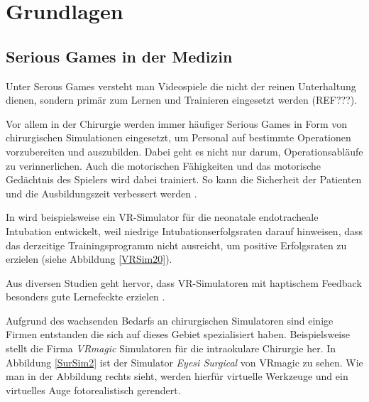 \chapter{Grundlagen}

\section{Serious Games in der Medizin}
\label{sec_SeriousGames}



Unter Serous Games versteht man Videospiele die nicht der reinen Unterhaltung dienen, sondern primär zum Lernen und Trainieren eingesetzt werden (REF???).

Vor allem in der Chirurgie werden immer häufiger Serious Games in Form von chirurgischen Simulationen eingesetzt, um Personal auf bestimmte Operationen vorzubereiten und auszubilden. Dabei geht es nicht nur darum, Operationsabläufe zu verinnerlichen. Auch die motorischen Fähigkeiten und das motorische Gedächtnis des Spielers wird dabei trainiert. So kann die Sicherheit der Patienten und die Ausbildungszeit verbessert werden \cite{SimRole}.

In \cite{VRSim20} wird beispielsweise ein VR-Simulator für die neonatale endotracheale Intubation entwickelt, weil niedrige Intubationserfolgsraten darauf hinweisen, dass das derzeitige Trainingsprogramm nicht ausreicht, um positive Erfolgsraten zu erzielen (siehe Abbildung \ref{VRSim20}).


Aus diversen Studien geht hervor, dass VR-Simulatoren mit haptischem Feedback besonders gute Lernefeckte erzielen \cite{VRHapticSim}.

Aufgrund des wachsenden Bedarfs an chirurgischen Simulatoren sind einige Firmen entstanden die sich auf dieses Gebiet spezialisiert haben. Beispielsweise stellt die Firma \textit{VRmagic} \cite{VRmagic} Simulatoren für die intraokulare Chirurgie her. In Abbildung \ref{SurSim2} ist der Simulator \textit{Eyesi Surgical} von VRmagic zu sehen. Wie man in der Abbildung rechts sieht, werden hierfür virtuelle Werkzeuge und ein virtuelles Auge fotorealistisch gerendert.

